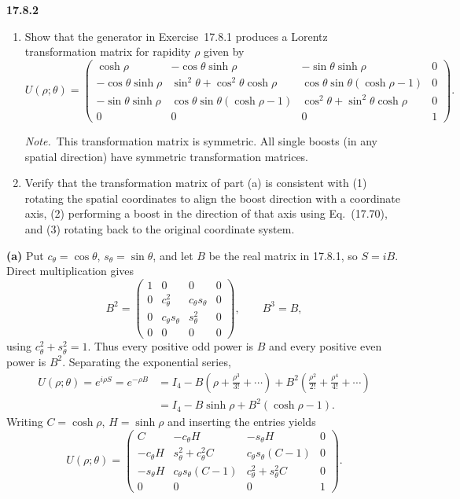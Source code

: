 \par\bigskip
\noindent\textbf{17.8.2}
\begin{enumerate}
\item[(a)] Show that the generator in Exercise~17.8.1 produces a
Lorentz transformation matrix for rapidity $\rho$ given by
\[
U(\rho;\theta)=\begin{pmatrix}
\cosh\rho & -\cos\theta\sinh\rho & -\sin\theta\sinh\rho & 0\\
-\cos\theta\sinh\rho & \sin^{2}\theta+\cos^{2}\theta\cosh\rho
& \cos\theta\sin\theta(\cosh\rho-1) & 0\\
-\sin\theta\sinh\rho & \cos\theta\sin\theta(\cosh\rho-1)
& \cos^{2}\theta+\sin^{2}\theta\cosh\rho & 0\\
0 & 0 & 0 & 1
\end{pmatrix}.
\]
\par\emph{Note.}~This transformation matrix is symmetric. All single
boosts (in any spatial direction) have symmetric transformation
matrices.
\item[(b)] Verify that the transformation matrix of part (a) is
consistent with (1) rotating the spatial coordinates to align the
boost direction with a coordinate axis, (2) performing a boost in the
direction of that axis using Eq.~(17.70), and (3) rotating back to
the original coordinate system.
\end{enumerate}
\solution
\textbf{(a)} Put $c_\theta=\cos\theta$, $s_\theta=\sin\theta$, and let $B$
be the real matrix in 17.8.1, so $S=iB$.
Direct multiplication gives
\[
B^2=\begin{pmatrix}
1&0&0&0\\
0&c_\theta^2&c_\theta s_\theta&0\\
0&c_\theta s_\theta&s_\theta^2&0\\
0&0&0&0
\end{pmatrix},\qquad B^3=B,
\]
using $c_\theta^2+s_\theta^2=1$.
Thus every positive odd power is $B$ and every positive even power is
$B^2$. Separating the exponential series,
\[
\begin{aligned}
U(\rho;\theta)=e^{i\rho S}=e^{-\rho B}
&=I_4-B\left(\rho+\frac{\rho^3}{3!}+\cdots\right)
+B^2\left(\frac{\rho^2}{2!}+\frac{\rho^4}{4!}+\cdots\right)\\
&=I_4-B\sinh\rho+B^2(\cosh\rho-1).
\end{aligned}
\]
Writing $C=\cosh\rho$, $H=\sinh\rho$ and inserting the entries yields
\[
\boxed{U(\rho;\theta)=
\begin{pmatrix}
C&-c_\theta H&-s_\theta H&0\\
-c_\theta H&s_\theta^2+c_\theta^2C&c_\theta s_\theta(C-1)&0\\
-s_\theta H&c_\theta s_\theta(C-1)&c_\theta^2+s_\theta^2C&0\\
0&0&0&1
\end{pmatrix}}.
\]
